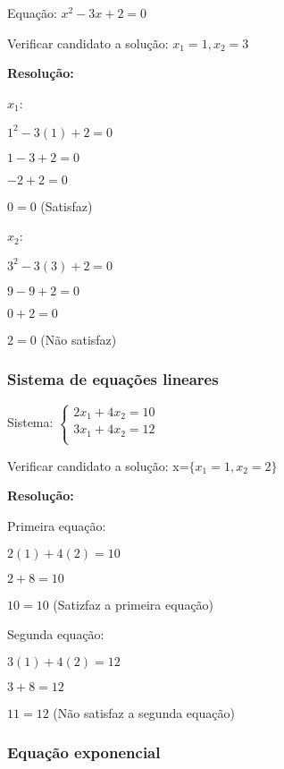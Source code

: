 \documentclass[a4paper]{article}
\begin{document}
Equação: $x^2 - 3x + 2 = 0$

Verificar candidato a solução: $x_1 = 1, x_2 = 3$

{\bf Resolução:}
\begin{multicols}{2}
$x_1$:

$1^2 -3(1) + 2 = 0$

$1 - 3 + 2 = 0$

$-2 + 2 = 0$

$0=0$ (Satisfaz)

\columnbreak

$x_2$:

$3^2 -3(3) +2 = 0$

$9-9+2 = 0 $

$0 + 2 = 0$

$2=0$ (Não satisfaz)

\end{multicols}

\subsubsection{Sistema de equações lineares}

Sistema: $
\left\{ \begin{array}{c}
    2x_1 + 4x_2 = 10\\
    3x_1 + 4x_2 = 12\\
  \end{array}
\right.$

Verificar candidato a solução: x=$\{x_1= 1, x_2=2\}$

{\bf Resolução:}

\begin{multicols}{2}
Primeira equação:

$2(1) +4(2)=10$

$2+8=10$

$10=10$ (Satizfaz a primeira equação)

\columnbreak
Segunda equação:

$3(1)+4(2)=12$

$3+8=12$

$11=12$ (Não satisfaz a segunda equação)

\end{multicols}


\subsubsection{Equação exponencial}
\end{document}

